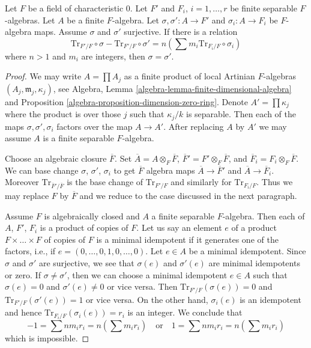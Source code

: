 \begin{lemma}
\label{lemma-algebra-relations}
Let $F$ be a field of characteristic $0$.
Let $F'$ and $F_i$, $i = 1, \ldots, r$
be finite separable $F$-algebras. Let $A$ be a finite $F$-algebra.
Let $\sigma, \sigma' : A \to F'$ and $\sigma_i : A \to F_i$
be $F$-algebra maps. Assume $\sigma$ and $\sigma'$ surjective.
If there is a relation
$$
\text{Tr}_{F'/F} \circ \sigma - \text{Tr}_{F'/F} \circ \sigma' =
n(\sum m_i \text{Tr}_{F_i/F} \circ \sigma_i)
$$
where $n > 1$ and $m_i$ are integers, then $\sigma = \sigma'$.
\end{lemma}

\begin{proof}
We may write $A = \prod A_j$ as a finite product of
local Artinian $F$-algebras $(A_j, \mathfrak m_j, \kappa_j)$, see
Algebra, Lemma \ref{algebra-lemma-finite-dimensional-algebra} and
Proposition \ref{algebra-proposition-dimension-zero-ring}.
Denote $A' = \prod \kappa_j$ where the product is over those $j$
such that $\kappa_j/k$ is separable. Then each of the maps
$\sigma, \sigma', \sigma_i$ factors over the map
$A \to A'$. After replacing $A$ by $A'$ we may assume
$A$ is a finite separable $F$-algebra.

\medskip\noindent
Choose an algebraic closure $\overline{F}$. Set
$\overline{A} = A \otimes_F \overline{F}$,
$\overline{F}' = F' \otimes_F \overline{F}$, and
$\overline{F}_i = F_i \otimes_F \overline{F}$.
We can base change $\sigma$, $\sigma'$, $\sigma_i$
to get $\overline{F}$ algebra maps $\overline{A} \to \overline{F}'$
and $\overline{A} \to \overline{F}_i$. Moreover
$\text{Tr}_{\overline{F}'/\overline{F}}$ is the base
change of $\text{Tr}_{F'/F}$ and similarly for
$\text{Tr}_{F_i/F}$. Thus we may replace
$F$ by $\overline{F}$ and we reduce to the case discussed in
the next paragraph.

\medskip\noindent
Assume $F$ is algebraically closed and $A$ a finite separable $F$-algebra.
Then each of $A$, $F'$, $F_i$ is a product of copies of $F$.
Let us say an element $e$ of a product
$F \times \ldots \times F$ of copies of $F$ is a minimal idempotent
if it generates one of the factors, i.e., if
$e = (0, \ldots, 0, 1, 0, \ldots, 0)$. Let $e \in A$ be a minimal idempotent.
Since $\sigma$ and $\sigma'$ 
are surjective, we see that $\sigma(e)$ and $\sigma'(e)$ are minimal
idempotents or zero. If $\sigma \not = \sigma'$, then we can choose
a minimal idempotent $e \in A$ such that $\sigma(e) = 0$ and
$\sigma'(e) \not = 0$ or vice versa. Then
$\text{Tr}_{F'/F}(\sigma(e)) = 0$ and
$\text{Tr}_{F'/F}(\sigma'(e)) = 1$ or vice versa.
On the other hand, $\sigma_i(e)$ is an idempotent
and hence $\text{Tr}_{F_i/F}(\sigma_i(e)) = r_i$ is an integer.
We conclude that
$$
-1 = \sum n m_i r_i = n (\sum m_i r_i)
\quad\text{or}\quad
1 = \sum n m_i r_i = n (\sum m_i r_i)
$$
which is impossible.
\end{proof}

